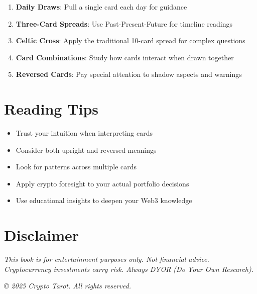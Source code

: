 \documentclass[11pt,oneside]{book}
\begin{document}
\begin{enumerate}
\item \textbf{Daily Draws}: Pull a single card each day for guidance
\item \textbf{Three-Card Spreads}: Use Past-Present-Future for timeline readings
\item \textbf{Celtic Cross}: Apply the traditional 10-card spread for complex questions
\item \textbf{Card Combinations}: Study how cards interact when drawn together
\item \textbf{Reversed Cards}: Pay special attention to shadow aspects and warnings
\end{enumerate}

\section*{Reading Tips}

\begin{itemize}
\item Trust your intuition when interpreting cards
\item Consider both upright and reversed meanings
\item Look for patterns across multiple cards
\item Apply crypto foresight to your actual portfolio decisions
\item Use educational insights to deepen your Web3 knowledge
\end{itemize}

\section*{Disclaimer}

\textit{This book is for entertainment purposes only. Not financial advice. Cryptocurrency investments carry risk. Always DYOR (Do Your Own Research).}

\vspace{2cm}

\begin{center}
\textit{© 2025 Crypto Tarot. All rights reserved.}
\end{center}
\end{document}
